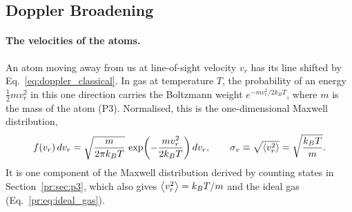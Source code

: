 \subsection{Doppler Broadening}

\paragraph{The velocities of the atoms.} An atom moving away from us at line-of-sight velocity $v_r$ has its line shifted by Eq.~\eqref{eq:doppler_classical}. In gas at temperature $T$, the probability of an energy $\tfrac12mv_r^2$ in this one direction carries the Boltzmann weight $e^{-mv_r^2/2k_BT}$, where $m$ is the mass of the atom (P3). Normalised, this is the one-dimensional Maxwell distribution,
\begin{equation}
	f(v_r)\,dv_r = \sqrt{\frac{m}{2\pi k_BT}}\,\exp\!\left(-\frac{mv_r^2}{2k_BT}\right)dv_r, \qquad \sigma_v \equiv \sqrt{\left\langle v_r^2\right\rangle} = \sqrt{\frac{k_BT}{m}} .
	\label{eq:maxwell_boltzmann_1d}
\end{equation}
It is one component of the Maxwell distribution derived by counting states in Section~\ref{pr:sec:p3}, which also gives $\left\langle v_r^2\right\rangle=k_BT/m$ and the ideal gas (Eq.~\eqref{pr:eq:ideal_gas}).

